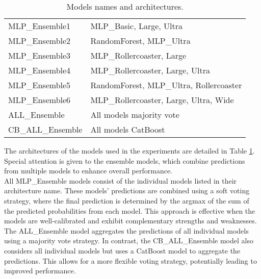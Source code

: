 \begin{table}[ht!]
\begin{tabular}{|ll|}
        MLP\_Ensemble1     & MLP\_Basic, Large, Ultra                   \\ 
        MLP\_Ensemble2     & RandomForest, MLP\_Ultra                   \\ 
        MLP\_Ensemble3     & MLP\_Rollercoaster, Large                  \\ 
        MLP\_Ensemble4     & MLP\_Rollercoaster, Large, Ultra           \\ 
        MLP\_Ensemble5     & RandomForest, MLP\_Ultra, Rollercoaster    \\ 
        MLP\_Ensemble6     & MLP\_Rollercoaster, Large, Ultra, Wide     \\ 
        ALL\_Ensemble      & All models majority vote                   \\ 
        CB\_ALL\_Ensemble  & All models CatBoost                        \\ \hline
    \end{tabular}
    \caption{Models names and architectures.}
    \label{tab:models}
\end{table}

The architectures of the models used in the experiments are detailed in Table \ref{tab:models}.
Special attention is given to the ensemble models, which combine predictions from multiple models
to enhance overall performance.\\
\noindent
All MLP\_Ensemble models consist of the individual models listed in their architecture name.
These models’ predictions are combined using a soft voting strategy, where the final prediction is
determined by the argmax of the sum of the predicted probabilities from each model. This approach is
effective when the models are well-calibrated and exhibit complementary strengths and weaknesses.\\
\noindent
The ALL\_Ensemble model aggregates the predictions of all individual models using a majority vote strategy.
In contrast, the CB\_ALL\_Ensemble model also considers all individual models but uses a CatBoost model to
aggregate the predictions. This allows for a more flexible voting strategy, potentially leading to improved
performance.